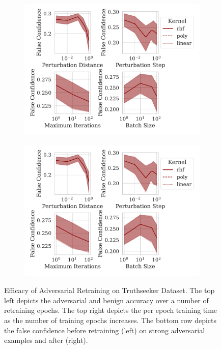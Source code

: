 \documentclass[fonts]{icst}
\begin{document}
\begin{appendices}
\begin{figure}[h!]
     \hfill
     \begin{subfigure}{0.47\textwidth}
         \centering
         \includegraphics[width=\textwidth]{./truthseeker/confidence_vs_attack_parameters.pdf}
     \end{subfigure}
     \hfill
     \begin{subfigure}{0.47\textwidth}
         \centering
         \includegraphics[width=\textwidth]{./truthseeker/retrain_confidence_vs_attack_parameters.pdf}
     \end{subfigure}
     \hfill
     \caption{Efficacy of Adversarial Retraining on Truthseeker Dataset. The top left depicts the adversarial and benign accuracy over a number of retraining epochs. The top right depicts the per epoch training time as the number of training epochs increases. The bottom row depicts the false confidence before retraining (left) on strong adversarial examples and after (right).}
     \label{fig:truthseeker}
\end{figure}
\end{appendices}
\end{document}
